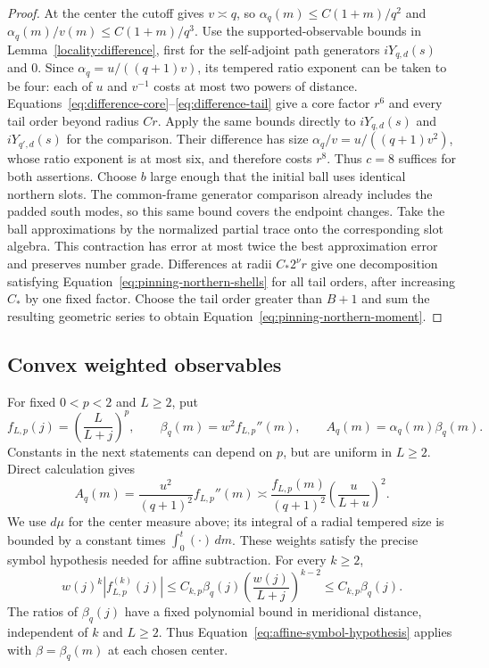 \begin{proof}
At the center the cutoff gives $v\asymp q$, so
$\alpha_q(m)\le C(1+m)/q^2$ and
$\alpha_q(m)/v(m)\le C(1+m)/q^3$.
Use the supported-observable bounds in
Lemma~\ref{locality:difference}, first for the self-adjoint path
generators $iY_{q,d}(s)$ and $0$.  Since
$\alpha_q=u/((q+1)v)$, its tempered ratio exponent can be taken to be
four: each of $u$ and $v^{-1}$ costs at most two powers of distance.
Equations~\eqref{eq:difference-core}--\eqref{eq:difference-tail} give
a core factor $r^6$ and every tail order beyond radius $Cr$.
Apply the same bounds directly to $iY_{q,d}(s)$ and
$iY_{q',d}(s)$ for the comparison.  Their difference has size
$\alpha_q/v=u/((q+1)v^2)$, whose ratio exponent is at most six, and
therefore costs $r^8$.  Thus $c=8$ suffices for both assertions.
Choose $b$ large enough that the initial ball uses identical northern
slots.  The common-frame generator comparison already includes the
padded south modes, so this same bound covers the endpoint changes.
Take the ball approximations by the normalized partial trace onto the
corresponding slot algebra.  This contraction has error at most twice
the best approximation error and preserves number grade.  Differences
at radii $C_*2^\nu r$ give one decomposition satisfying
Equation~\eqref{eq:pinning-northern-shells} for all tail orders,
after increasing $C_*$ by one fixed factor.  Choose the tail order
greater than $B+1$ and sum
the resulting geometric series to obtain
Equation~\eqref{eq:pinning-northern-moment}.
\end{proof}

\subsection{Convex weighted observables}

For fixed $0<p<2$ and $L\ge2$, put
\[
 f_{L,p}(j)=\left(\frac L{L+j}\right)^p,\qquad
 \beta_q(m)=w^2 f_{L,p}''(m),\qquad
 A_q(m)=\alpha_q(m)\beta_q(m).
\]
Constants in the next statements can depend on $p$, but are uniform in
$L\ge2$.  Direct calculation gives
\begin{equation}
 A_q(m)=\frac{u^2}{(q+1)^2}f_{L,p}''(m)
 \asymp\frac{f_{L,p}(m)}{(q+1)^2}
           \left(\frac{u}{L+u}\right)^2.
 \label{eq:pinning-weight-size}
\end{equation}
We use $d\mu$ for the center measure above; its integral of a radial
tempered size is bounded by a constant times $\int_0^t(\cdot)\,dm$.
These weights satisfy the precise symbol hypothesis needed for affine
subtraction.  For every $k\ge2$,
\[
 w(j)^k|f_{L,p}^{(k)}(j)|
 \le C_{k,p}\beta_q(j)
             \left(\frac{w(j)}{L+j}\right)^{k-2}
 \le C_{k,p}\beta_q(j).
\]
The ratios of $\beta_q(j)$ have a fixed polynomial bound in meridional
distance, independent of $k$ and $L\ge2$.  Thus
Equation~\eqref{eq:affine-symbol-hypothesis} applies with
$\beta=\beta_q(m)$ at each chosen center.

